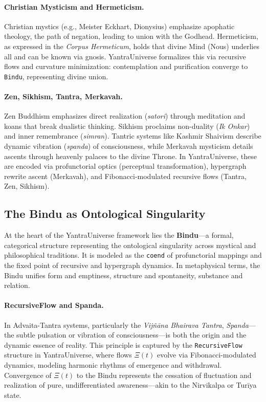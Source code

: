 \documentclass[12pt]{article}
\theoremstyle{plain}
\begin{document}
\paragraph{Christian Mysticism and Hermeticism.}
Christian mystics (e.g., Meister Eckhart, Dionysius) emphasize apophatic theology, the path of negation, leading to union with the Godhead. Hermeticism, as expressed in the \textit{Corpus Hermeticum}, holds that divine Mind (Nous) underlies all and can be known via gnosis. YantraUniverse formalizes this via recursive flows and curvature minimization: contemplation and purification converge to \texttt{Bindu}, representing divine union.

\paragraph{Zen, Sikhism, Tantra, Merkavah.}
Zen Buddhism emphasizes direct realization (\textit{satori}) through meditation and koans that break dualistic thinking. Sikhism proclaims non-duality (\textit{Ik Onkar}) and inner remembrance (\textit{simran}). Tantric systems like Kashmir Shaivism describe dynamic vibration (\textit{spanda}) of consciousness, while Merkavah mysticism details ascents through heavenly palaces to the divine Throne. In YantraUniverse, these are encoded via profunctorial optics (perceptual transformation), hypergraph rewrite ascent (Merkavah), and Fibonacci-modulated recursive flows (Tantra, Zen, Sikhism).

\subsection{The Bindu as Ontological Singularity}

At the heart of the YantraUniverse framework lies the \textbf{Bindu}—a formal, categorical structure representing the ontological singularity across mystical and philosophical traditions. It is modeled as the \texttt{coend} of profunctorial mappings and the fixed point of recursive and hypergraph dynamics. In metaphysical terms, the Bindu unifies form and emptiness, structure and spontaneity, substance and relation.

\paragraph{RecursiveFlow and Spanda.}
In Advaita-Tantra systems, particularly the \textit{Vijñāna Bhairava Tantra}, \textit{Spanda}—the subtle pulsation or vibration of consciousness—is both the origin and the dynamic essence of reality. This principle is captured by the \texttt{RecursiveFlow} structure in YantraUniverse, where flows $\Xi(t)$ evolve via Fibonacci-modulated dynamics, modeling harmonic rhythms of emergence and withdrawal. Convergence of $\Xi(t)$ to the Bindu represents the cessation of fluctuation and realization of pure, undifferentiated awareness—akin to the Nirvikalpa or Turīya state.
\end{document}
